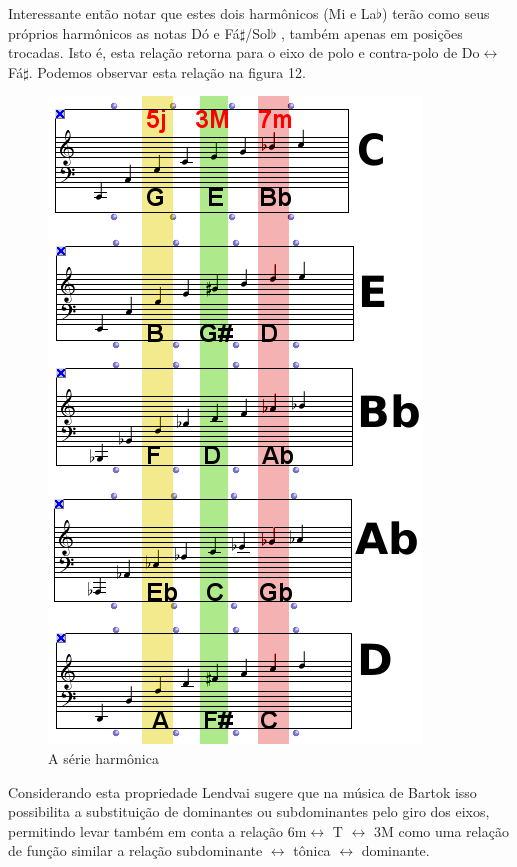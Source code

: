\documentclass[
	12pt,				%
	openright,			%
	twoside,			%
	a4paper,			%
	english,			%
	french,				%
	spanish,			%
	brazil				%
	]{abntex2}
\begin{document}
Interessante então notar que estes dois harmônicos (Mi e La$\flat$) terão como seus próprios harmônicos as notas Dó e Fá$\sharp$/Sol$\flat$ , também apenas em posições trocadas. Isto é, esta relação retorna para o eixo de polo e contra-polo de Do$\leftrightarrow$Fá$\sharp$. Podemos observar esta relação na figura 12.
 

\begin{figure}[!h]
	\caption{\label{fig_grafico}A série harmônica }
	\begin{center}
	    \includegraphics[scale=0.65]{axis/eixo_acustico.png}
	\end{center}
\end{figure}

Considerando esta propriedade Lendvai sugere que na música de Bartok isso possibilita a substituição de dominantes ou subdominantes pelo giro dos eixos, permitindo levar também em conta a relação 6m$\leftrightarrow$ T $\leftrightarrow$ 3M como uma relação de função similar a relação subdominante $\leftrightarrow$ tônica $\leftrightarrow$ dominante. 
\end{document}
